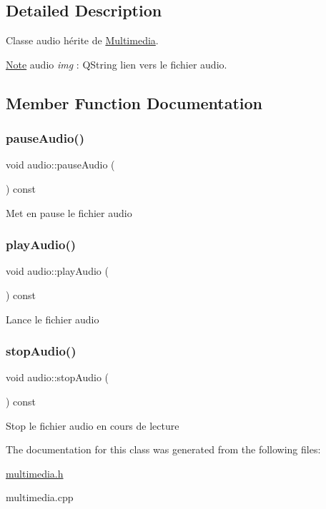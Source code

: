\subsection{Detailed Description}
Classe audio hérite de \hyperlink{class_multimedia}{Multimedia}. 

\hyperlink{class_note}{Note} audio {\itshape img} \+: Q\+String lien vers le fichier audio. 

\subsection{Member Function Documentation}
\mbox{\label{classaudio_a60e83448a15e15ad9807fe7bfaa1c3a6}} 
\subsubsection{\texorpdfstring{pause\+Audio()}{pauseAudio()}}
{\footnotesize\ttfamily void audio\+::pause\+Audio (\begin{DoxyParamCaption}{ }\end{DoxyParamCaption}) const}

Met en pause le fichier audio \mbox{\label{classaudio_afa3edab5ab68f7a2b81add684b420229}} 
\subsubsection{\texorpdfstring{play\+Audio()}{playAudio()}}
{\footnotesize\ttfamily void audio\+::play\+Audio (\begin{DoxyParamCaption}{ }\end{DoxyParamCaption}) const}

Lance le fichier audio \mbox{\label{classaudio_a0006d6803ff781ff76b8e2fda0924cd0}} 
\subsubsection{\texorpdfstring{stop\+Audio()}{stopAudio()}}
{\footnotesize\ttfamily void audio\+::stop\+Audio (\begin{DoxyParamCaption}{ }\end{DoxyParamCaption}) const}

Stop le fichier audio en cours de lecture 

The documentation for this class was generated from the following files\+:\begin{DoxyCompactItemize}
\item 
\hyperlink{multimedia_8h}{multimedia.\+h}\item 
multimedia.\+cpp\end{DoxyCompactItemize}

